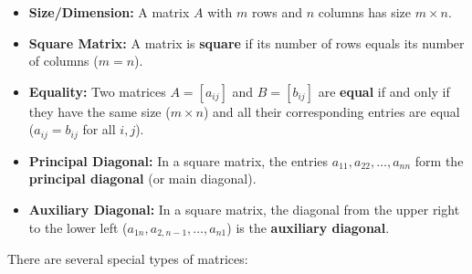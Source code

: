 \begin{itemize}
    \item \textbf{Size/Dimension:} A matrix $A$ with $m$ rows and $n$ columns has size $m \times n$.
    \item \textbf{Square Matrix:} A matrix is \textbf{square} if its number of rows equals its number of columns ($m=n$).
    \item \textbf{Equality:} Two matrices $A = [a_{ij}]$ and $B = [b_{ij}]$ are \textbf{equal} if and only if they have the same size ($m \times n$) and all their corresponding entries are equal ($a_{ij} = b_{ij}$ for all $i, j$).
    \item \textbf{Principal Diagonal:} In a square matrix, the entries $a_{11}, a_{22}, \ldots, a_{nn}$ form the \textbf{principal diagonal} (or main diagonal).
    \item \textbf{Auxiliary Diagonal:} In a square matrix, the diagonal from the upper right to the lower left ($a_{1n}, a_{2,n-1}, \ldots, a_{n1}$) is the \textbf{auxiliary diagonal}.
\end{itemize}

There are several special types of matrices:

% 

